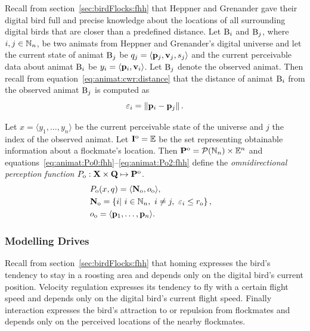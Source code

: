 Recall from section~\ref{sec:birdFlocks:fhh} that Heppner and Grenander gave their digital bird full and precise knowledge about the locations of all surrounding digital birds that are closer than a predefined distance. Let ${\mathrm{B}}_i$ and ${\mathrm{B}}_j$, where $i, j \in \mathbb{N}_n$, be two animats from Heppner and Grenander's digital universe and let the current state of animat ${\mathrm{B}}_j$ be $q_j=\langle {\ensuremath{\mathbf{p}}}_j,{\mathbf{v}}_j,s_j \rangle$ and the current perceivable data about animat ${\mathrm{B}}_i$ be $y_i=\langle {\ensuremath{\mathbf{p}}}_i, {\mathbf{v}}_i \rangle$. Let ${\mathrm{B}}_j$ denote the observed animat. Then recall from equation~\eqref{eq:animat:cwr:distance} that the distance of animat ${\mathrm{B}}_i$ from the observed animat ${\mathrm{B}}_j$ is computed as
%
\begin{equation}
\varepsilon_i%
 =\left\|\vect{p}_i - \vect{p}_j\right\|. \nonumber
\end{equation}

\begin{defn}
\label{def:animat:Po:fhh}
Let $x=\langle y_1,\ldots,y_n\rangle$ be the current perceivable state of the universe and $j$ the index of the observed animat. Let ${\mathbf{I}}^\mathrm{o}=\mathbb{E}$ be the set representing obtainable information about a flockmate's location. Then ${\mathbf{P}}^\mathrm{o}={\mathcal{P}(\mathbb{N}_n)} \times \mathbb{E}^n$ and equations~\eqref{eq:animat:Po0:fhh}--\eqref{eq:animat:Po2:fhh} define the \emph{omnidirectional perception function} $P_\mathrm{o}: {\mathbf{X}} \times {\ensuremath{\mathbf{Q}}} \mapsto {\ensuremath{\mathbf{P}}}^\mathrm{o}$.
\begin{eqnarray}
& P_\mathrm{o}(x,q)=\langle{\ensuremath{\mathbf{N}}}_\mathrm{o},o_\mathrm{o}\rangle, & \label{eq:animat:Po0:fhh} \\
& {\mathbf{N}}_\mathrm{o}=\left\{i|\ i \in \mathbb{N}_n,\ i \neq j,\ \varepsilon_i \leq r_\mathrm{o} \right\}, & \\ 
& o_\mathrm{o}=\langle {\ensuremath{\mathbf{p}}}_1,\ldots,{\mathbf{p}}_n\rangle. & \label{eq:animat:Po2:fhh}
\end{eqnarray}
\end{defn}

\subsubsection{Modelling Drives}
Recall from section~\ref{sec:birdFlocks:fhh} that homing expresses the bird's tendency to stay in a roosting area and depends only on the digital bird's current position. Velocity regulation expresses its tendency to fly with a certain flight speed and depends only on the digital bird's current flight speed. Finally interaction expresses the bird's attraction to or repulsion from flockmates and depends only on the perceived locations of the nearby flockmates. 

